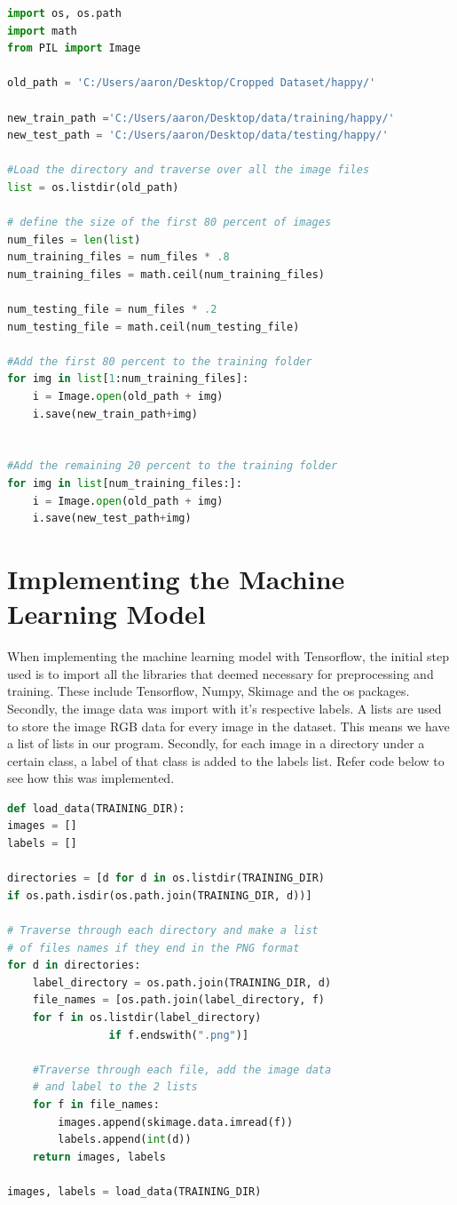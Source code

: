 \begin{lstlisting}[language=Python, frame=single]
import os, os.path
import math
from PIL import Image

old_path = 'C:/Users/aaron/Desktop/Cropped Dataset/happy/'

new_train_path ='C:/Users/aaron/Desktop/data/training/happy/'
new_test_path = 'C:/Users/aaron/Desktop/data/testing/happy/'

#Load the directory and traverse over all the image files
list = os.listdir(old_path)

# define the size of the first 80 percent of images
num_files = len(list)
num_training_files = num_files * .8
num_training_files = math.ceil(num_training_files)

num_testing_file = num_files * .2
num_testing_file = math.ceil(num_testing_file)

#Add the first 80 percent to the training folder
for img in list[1:num_training_files]: 
	i = Image.open(old_path + img)
	i.save(new_train_path+img)


#Add the remaining 20 percent to the training folder
for img in list[num_training_files:]:
	i = Image.open(old_path + img)
	i.save(new_test_path+img)
\end{lstlisting}

\section{Implementing the Machine Learning Model}

When implementing the machine learning model with Tensorflow, the initial step used is to import all the libraries that deemed necessary for preprocessing and training. These include Tensorflow, Numpy, Skimage and the os packages. Secondly, the image data was import with it's respective labels. A lists are used to store the image RGB data for every image in the dataset. This means we have a list of lists in our program. Secondly, for each image in a directory under a certain class, a label of that class is added to the labels list. Refer code below to see how this was implemented.

\begin{lstlisting}[language=Python, frame=single]
def load_data(TRAINING_DIR):
images = []
labels = []

directories = [d for d in os.listdir(TRAINING_DIR) 
if os.path.isdir(os.path.join(TRAINING_DIR, d))]

# Traverse through each directory and make a list
# of files names if they end in the PNG format
for d in directories:
	label_directory = os.path.join(TRAINING_DIR, d)
	file_names = [os.path.join(label_directory, f) 
	for f in os.listdir(label_directory) 
				if f.endswith(".png")]
	
	#Traverse through each file, add the image data
	# and label to the 2 lists
	for f in file_names:
		images.append(skimage.data.imread(f))
		labels.append(int(d))
	return images, labels

images, labels = load_data(TRAINING_DIR)
\end{lstlisting}


